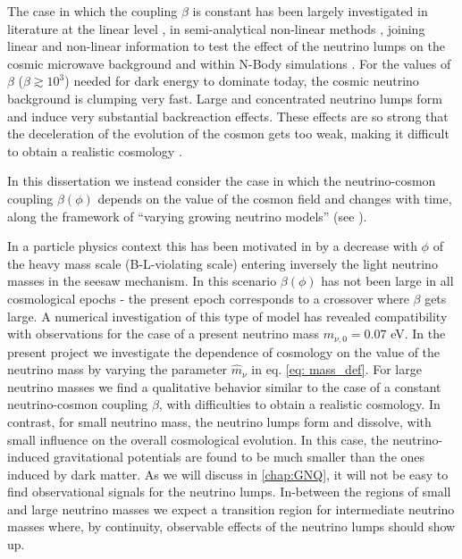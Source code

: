 The case in which the coupling $\beta$ is constant has been largely
investigated in literature at the linear level \cite{mota_neutrino_2008},
in semi-analytical non-linear methods \cite{wintergerst_clarifying_2010,wintergerst_very_2010,brouzakis_nonlinear_2011},
joining linear and non-linear information to test the effect of the
neutrino lumps on the cosmic microwave background \cite{pettorino_neutrino_2010}
and within N-Body simulations \cite{ayaita_neutrino_2013,ayaita_structure_2012,baldi_oscillating_2011,ayaita_nonlinear_2016}.
For the values of $\beta$ ($\beta\gtrsim10^{3}$) needed for dark
energy to dominate today, the cosmic neutrino background is clumping
very fast. Large and concentrated neutrino lumps form and induce very
substantial backreaction effects. These effects are so strong that
the deceleration of the evolution of the cosmon gets too weak, making
it difficult to obtain a realistic cosmology \cite{fuhrer_backreaction_2015}.

In this dissertation we instead consider the case in which the neutrino-cosmon
coupling $\beta(\phi)$ depends on the value of the cosmon field and
changes with time, along the framework of ``varying growing neutrino models''
(see \cite{wetterich_growing_2007, la_vacca_mass-varying_2013}). 

In a particle physics context this has been motivated in 
\cite{wetterich_growing_2007} by a decrease with $\phi$ of the heavy
mass scale (B-L-violating scale) entering inversely the light neutrino
masses in the seesaw mechanism. 
In this scenario $\beta(\phi)$ has not been large in all
cosmological epochs - the present epoch corresponds to a crossover
where $\beta$ gets large. A numerical investigation \cite{baldi_oscillating_2011}
of this type of model has revealed compatibility with observations
for the case of a present neutrino mass $m_{\nu,0}=0.07$ eV. In the
present project we investigate the dependence of cosmology on the value
of the neutrino mass by varying the parameter $\hat{m}_{\nu}$ in
eq. \ref{eq: mass_def}. For large neutrino masses we find a
qualitative behavior similar to the case of a constant neutrino-cosmon
coupling $\beta$, with difficulties to obtain a realistic cosmology.
In contrast, for small neutrino mass, the neutrino lumps form and
dissolve, with small influence on the overall cosmological evolution.
In this case, the neutrino-induced gravitational potentials are found
to be much smaller than the ones induced by dark matter. As we will
discuss in \cref{chap:GNQ}, it will not be easy to find observational signals
for the neutrino lumps. In-between the regions of small and large
neutrino masses we expect a transition region for intermediate neutrino
masses where, by continuity, observable effects of the neutrino lumps
should show up.

